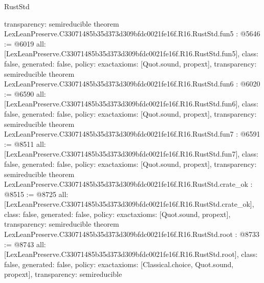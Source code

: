 \begin{lexlean}{RustStd}
\begin{coremodule}
{  transparency: semireducible
}
theorem LexLeanPreserve.C33071485b35d373d309bfdc0021fe16f.R16.RustStd.fun5 : @5646 := @6019 {
  all: [LexLeanPreserve.C33071485b35d373d309bfdc0021fe16f.R16.RustStd.fun5],
  class: false,
  generated: false,
  policy: exact{axioms: [Quot.sound, propext]},
  transparency: semireducible
}
theorem LexLeanPreserve.C33071485b35d373d309bfdc0021fe16f.R16.RustStd.fun6 : @6020 := @6590 {
  all: [LexLeanPreserve.C33071485b35d373d309bfdc0021fe16f.R16.RustStd.fun6],
  class: false,
  generated: false,
  policy: exact{axioms: [Quot.sound, propext]},
  transparency: semireducible
}
theorem LexLeanPreserve.C33071485b35d373d309bfdc0021fe16f.R16.RustStd.fun7 : @6591 := @8511 {
  all: [LexLeanPreserve.C33071485b35d373d309bfdc0021fe16f.R16.RustStd.fun7],
  class: false,
  generated: false,
  policy: exact{axioms: [Quot.sound, propext]},
  transparency: semireducible
}
theorem LexLeanPreserve.C33071485b35d373d309bfdc0021fe16f.R16.RustStd.crate_ok : @8515 := @8725 {
  all: [LexLeanPreserve.C33071485b35d373d309bfdc0021fe16f.R16.RustStd.crate_ok],
  class: false,
  generated: false,
  policy: exact{axioms: [Quot.sound, propext]},
  transparency: semireducible
}
theorem LexLeanPreserve.C33071485b35d373d309bfdc0021fe16f.R16.RustStd.root : @8733 := @8743 {
  all: [LexLeanPreserve.C33071485b35d373d309bfdc0021fe16f.R16.RustStd.root],
  class: false,
  generated: false,
  policy: exact{axioms: [Classical.choice, Quot.sound, propext]},
  transparency: semireducible
}


\end{coremodule}
\end{lexlean}
